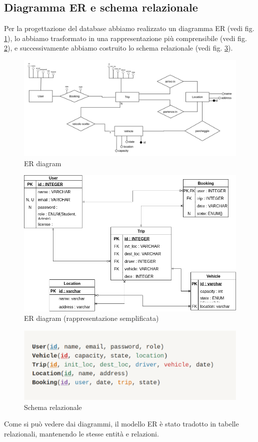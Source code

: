 \subsection{Diagramma ER e schema relazionale}\label{subsec:DB}
Per la progettazione del database abbiamo realizzato un diagramma ER (vedi fig. \ref{fig:ERdiag}), lo abbiamo trasformato in una rappresentazione più comprensibile (vedi fig. \ref{fig:ERraw}), e successivamente abbiamo costruito lo schema relazionale (vedi fig. \ref{fig:ERscheme}).
\begin{figure}[H]
    \centering
    \includegraphics[width=1.1\linewidth]{Images/ER_diagram.png}
    \caption{ER diagram}
    \label{fig:ERdiag}
\end{figure}
\begin{figure}[H]
    \centering
    \includegraphics[width=1.2\linewidth]{Images/ERraw.png}
    \caption{ER diagram (rappresentazione semplificata)}
    \label{fig:ERraw}
\end{figure}
\begin{figure}[H]
    \centering
    \includegraphics[width=0.8\linewidth]{Images/schema_relazionale.png}
    \caption{Schema relazionale}
    \label{fig:ERscheme}
\end{figure}
Come si può  vedere dai diagrammi, il modello ER è stato tradotto in tabelle relazionali, mantenendo le stesse entità e relazioni.